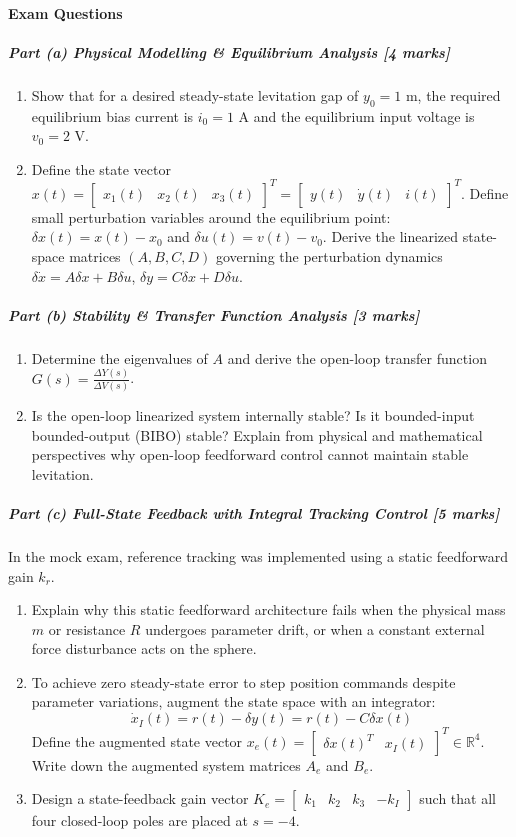 \documentclass[12pt,onecolumn,twoside ]{article}
\begin{document}
	\paragraph{Exam Questions}
	\subparagraph{\textbf{Part (a) Physical Modelling \& Equilibrium Analysis [4 marks]}}
	\begin{enumerate}
		\item
		Show that for a desired steady-state levitation gap of $y_0 = 1\text{ m}$, the required equilibrium bias current is $i_0 = 1\text{ A}$ and the equilibrium input voltage is $v_0 = 2\text{ V}$.
		\item
		Define the state vector $x(t) = \begin{bmatrix} x_1(t) & x_2(t) & x_3(t) \end{bmatrix}^T = \begin{bmatrix} y(t) & \dot{y}(t) & i(t) \end{bmatrix}^T$. Define small perturbation variables around the equilibrium point: $\delta x(t) = x(t) - x_0$ and $\delta u(t) = v(t) - v_0$. Derive the linearized state-space matrices $(A, B, C, D)$ governing the perturbation dynamics $\delta \dot{x} = A \delta x + B \delta u$, $\delta y = C \delta x + D \delta u$.
	\end{enumerate}
	\subparagraph{\textbf{Part (b) Stability \& Transfer Function Analysis [3 marks]}}
	\begin{enumerate}
		\item
		Determine the eigenvalues of $A$ and derive the open-loop transfer function $G(s) = \frac{\Delta Y(s)}{\Delta V(s)}$.
		\item
		Is the open-loop linearized system internally stable? Is it bounded-input bounded-output (BIBO) stable? Explain from physical and mathematical perspectives why open-loop feedforward control cannot maintain stable levitation.
	\end{enumerate}
	\subparagraph{\textbf{Part (c) Full-State Feedback with Integral Tracking Control [5 marks]}}
	In the mock exam, reference tracking was implemented using a static feedforward gain $k_r$.
	\begin{enumerate}
		\item
		Explain why this static feedforward architecture fails when the physical mass $m$ or resistance $R$ undergoes parameter drift, or when a constant external force disturbance acts on the sphere.
		\item
		To achieve zero steady-state error to step position commands despite parameter variations, augment the state space with an integrator: \[
		\dot{x}_I(t) = r(t) - \delta y(t) = r(t) - C \delta x(t)
		\] Define the augmented state vector $x_e(t) = \begin{bmatrix} \delta x(t)^T & x_I(t) \end{bmatrix}^T \in \mathbb{R}^4$. Write down the augmented system matrices $A_e$ and $B_e$.
		\item
		Design a state-feedback gain vector $K_e = \begin{bmatrix} k_1 & k_2 & k_3 & -k_I \end{bmatrix}$ such that all four closed-loop poles are placed at $s = -4$.
	\end{enumerate}
\end{document}
